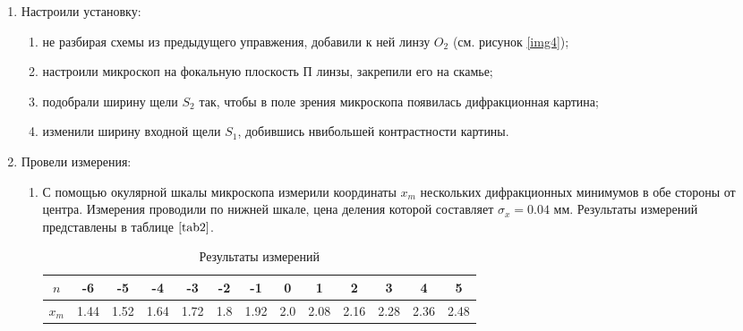 \documentclass[a4paper,12pt]{article} %
\begin{document}
\begin{enumerate}
    \item Настроили установку:
    \begin{enumerate}
        \item не разбирая схемы из предыдущего управжения, добавили к ней линзу $O_2$ (см. рисунок \ref{img4});
        \item настроили микроскоп на фокальную плоскость $\text{П}$ линзы, закрепили его на скамье;
        \item подобрали ширину щели $S_2$ так, чтобы в поле зрения микроскопа появилась дифракционная картина;
        \item изменили ширину входной щели $S_1$, добившись нвибольшей контрастности картины.
    \end{enumerate}
    \item Провели измерения:
    \begin{enumerate}
        \item С помощью окулярной шкалы микроскопа измерили координаты $x_{m}$ нескольких дифракционных минимумов в обе стороны от центра. Измерения проводили по нижней шкале, цена деления которой составляет $\sigma_{x}=0.04\text{ мм}$. Результаты измерений представлены в таблице $\ref{tab2}$.

    \begin{table}[h]
    \centering
    \begin{tabular}{|c|c|c|c|c|c|c|c|c|c|c|c|c|}
        \hline
            $n$ & -6 & -5 & -4 & -3 & -2 & -1 & 0 & 1 & 2 & 3 & 4 & 5 \\ \hline
            $x_{m}$ & 1.44 & 1.52 & 1.64 & 1.72 & 1.8 & 1.92 & 2.0 & 2.08 & 2.16 & 2.28 & 2.36 & 2.48 \\ \hline
        \end{tabular}
    \caption{Результаты измерений}
    \label{tab2}
    \end{table}


\end{enumerate}
\end{enumerate}
\end{document}
